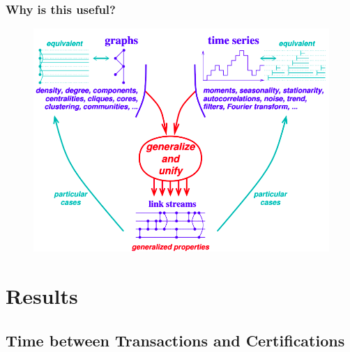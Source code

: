 \documentclass{beamer}
\begin{document}
\begin{frame}
\begin{center}
\begin{figure}
		\end{figure}
	\end{center}
\end{frame}


\begin{frame}
	\frametitle{Why is this useful?}	
	\begin{center}
		\begin{figure}
			\includegraphics[width=.8\linewidth]{./figures/stream_unification}
		\end{figure}
	\end{center}
\end{frame}


\section{Results}

\subsection{Time between Transactions and Certifications}
\end{document}
